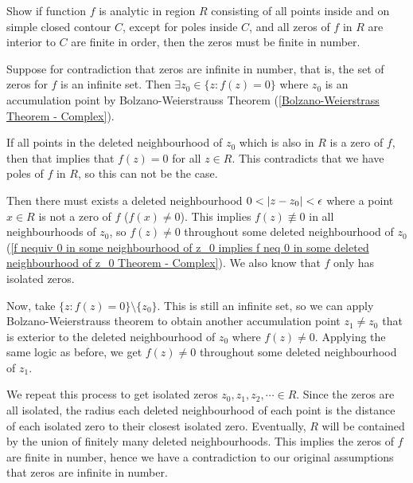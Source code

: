\documentclass[12pt, english]{book}
\makeatletter
\renewenvironment{proof}[1][\proofname]{\par
	\pushQED{\qed}%
	\normalfont \topsep6\p@\@plus6\p@\relax
	\list{}{%
		\settowidth{\leftmargin}{\itshape\proofname:\hskip\labelsep}%
		\setlength{\labelwidth}{0pt}%
		\setlength{\itemindent}{-\leftmargin}%
	}%
	\item[\hskip\labelsep\itshape#1\@addpunct{:}]\ignorespaces
	}{ \popQED\endlist\@endpefalse}
\makeatother
\begin{document}
	\begin{example}
		\label{Finite order of zeros in simple closed contour implies finite zeros Example - Complex}
		Show if function \(f\) is analytic in region \(R\) consisting of all points inside and on simple closed contour \(C\), except for poles inside \(C\), and all zeros of \(f\) in \(R\) are interior to \(C\) are finite in order, then the zeros must be finite in number.
		
	\end{example}
	\begin{proof}
		{\color{Grey}
		Suppose for contradiction that zeros are infinite in number, that is, the set of zeros for \(f\) is an infinite set. Then \(\exists z_0 \in \{z : f(z) = 0\}\) where \(z_0\) is an accumulation point by Bolzano-Weierstrauss Theorem (\cref{Bolzano-Weierstrass Theorem - Complex}).
		
		If all points in the deleted neighbourhood of \(z_0\) which is also in \(R\) is a zero of \(f\), then that implies that \(f(z) = 0\) for all \(z \in R\). This contradicts that we have poles of \(f\) in \(R\), so this can not be the case. 
		
		Then there must exists a deleted neighbourhood \(0 < \abs{z-z_0}<\epsilon\) where a point \(x \in R\) is not a zero of \(f\) (\(f(x) \neq 0\)). This implies \(f(z) \nequiv 0\) in all neighbourhoods of \(z_0\), so \(f(z) \neq 0\) throughout some deleted neighbourhood of \(z_0\) (\cref{f nequiv 0 in some neighbourhood of z_0 implies f neq 0 in some deleted neighbourhood of z_0 Theorem - Complex}). We also know that \(f\) only has isolated zeros.
		
		Now, take \(\{z : f(z) = 0\} \setminus \{z_0\}\). This is still an infinite set, so we can apply Bolzano-Weierstrauss theorem to obtain another accumulation point \(z_1 \neq z_0\) that is exterior to the deleted neighbourhood of \(z_0\) where \(f(z) \neq 0\). Applying the same logic as before, we get \(f(z) \neq 0\) throughout some deleted neighbourhood of \(z_1\). 
		
		We repeat this process to get isolated zeros \(z_0, z_1, z_2, \cdots \in R\). Since the zeros are all isolated, the radius each deleted neighbourhood of each point is the distance of each isolated zero to their closest isolated zero. Eventually, \(R\) will be contained by the union of finitely many deleted neighbourhoods. This implies the zeros of \(f\) are finite in number, hence we have a contradiction to our original assumptions that zeros are infinite in number.
		}
	\end{proof}
\end{document}
